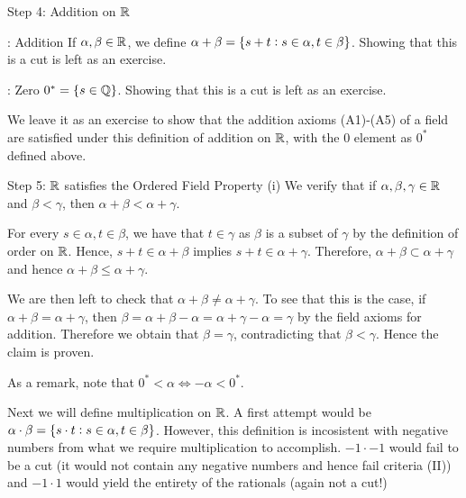 \begin{nblank}{Step 4: Addition on $\mathbb{R}$}
    \begin{ndef}{: Addition}
        If $\alpha, \beta \in \mathbb{R}$, we define $\alpha + \beta = \set{s + t: s \in \alpha, t \in \beta}$. Showing that this is a cut is left as an exercise.
    \end{ndef}
    \begin{ndef}{: Zero}
        $0^* = \set{s \in \mathbb{Q}}$. Showing that this is a cut is left as an exercise.
    \end{ndef}

    We leave it as an exercise to show that the addition axioms (A1)-(A5) of a field are satisfied under this definition of addition on $\mathbb{R}$, with the 0 element as $0^*$ defined above.
\end{nblank}

\begin{nblank}{Step 5: $\mathbb{R}$ satisfies the Ordered Field Property (i)}
    We verify that if $\alpha, \beta, \gamma \in \mathbb{R}$ and $\beta < \gamma$, then $\alpha + \beta < \alpha + \gamma$. 

    For every $s \in \alpha, t \in \beta$, we have that $t \in \gamma$ as $\beta$ is a subset of $\gamma$ by the definition of order on $\mathbb{R}$. Hence, $s + t \in \alpha + \beta$ implies $s + t \in \alpha + \gamma$. Therefore, $\alpha + \beta \subset \alpha + \gamma$ and hence $\alpha + \beta \leq \alpha + \gamma$. 

    We are then left to check that $\alpha + \beta \neq \alpha + \gamma$. To see that this is the case, if $\alpha + \beta = \alpha + \gamma$, then $\beta = \alpha + \beta - \alpha = \alpha + \gamma - \alpha = \gamma$ by the field axioms for addition. Therefore we obtain that $\beta = \gamma$, contradicting that $\beta < \gamma$. Hence the claim is proven.

    As a remark, note that $0^* < \alpha \iff -\alpha < 0^*$.
\end{nblank}
\noindent Next we will define multiplication on $\mathbb{R}$. A first attempt would be $\alpha \cdot \beta = \set{s \cdot t: s\in \alpha, t \in \beta}$. However, this definition is incosistent with negative numbers from what we require multiplication to accomplish. $-1 \cdot -1$ would fail to be a cut (it would not contain any negative numbers and hence fail criteria (II)) and $-1 \cdot 1$ would yield the entirety of the rationals (again not a cut!)

